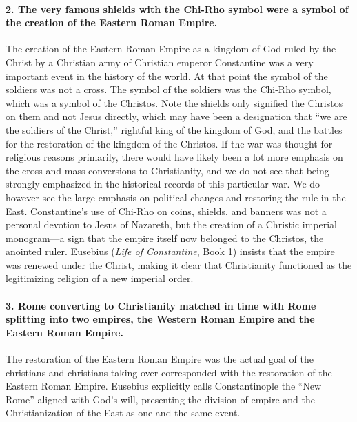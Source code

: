 \paragraph{2.
The very famous shields with the Chi-Rho symbol were a symbol of the creation of the Eastern Roman Empire.}\label{par:the-very-famous-shields-of-with-the-chi-rho-symbol-were-a-symbol-of-the-creation-of-the-eastern-roman-empire.}

The creation of the Eastern Roman Empire as a kingdom of God ruled by the Christ by a Christian army of Christian emperor Constantine was a very important event in the history of the world.
At that point the symbol of the soldiers was not a cross.
The symbol of the soldiers was the Chi-Rho symbol, which was a symbol of the Christos.
Note the shields only signified the Christos on them and not Jesus directly, which may have been a designation that ``we are the soldiers of the Christ,'' rightful king of the kingdom of God, and the battles for the restoration of the kingdom of the Christos.
If the war was thought for religious reasons primarily, there would have likely been a lot more emphasis on the cross and mass conversions to Christianity, and we do not see that being strongly emphasized in the historical records of this particular war.
We do however see the large emphasis on political changes and restoring the rule in the East.
Constantine’s use of Chi-Rho on coins, shields, and banners was not a personal devotion to Jesus of Nazareth, but the creation of a Christic imperial monogram---a sign that the empire itself now belonged to the Christos, the anointed ruler.
Eusebius (\emph{Life of Constantine}, Book 1) insists that the empire was renewed under the Christ, making it clear that Christianity functioned as the legitimizing religion of a new imperial order.

\paragraph{3.
Rome converting to Christianity matched in time with Rome splitting into two empires, the Western Roman Empire and the Eastern Roman Empire.}\label{par:rome-converting-to-christianity-matched-in-time-with-rome-splitting-into-two-empires-the-western-roman-empire-and-the-eastern-roman-empire.}

The restoration of the Eastern Roman Empire was the actual goal of the christians and christians taking over corresponded with the restoration of the Eastern Roman Empire.
Eusebius explicitly calls Constantinople the ``New Rome'' aligned with God’s will, presenting the division of empire and the Christianization of the East as one and the same event.

